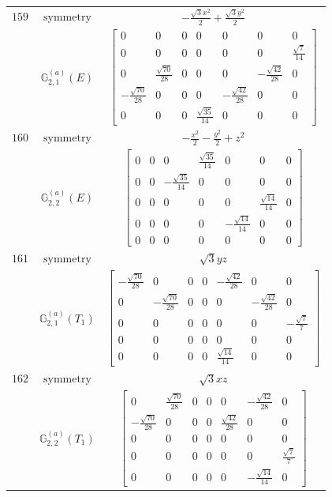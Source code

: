 \documentclass[fleqn,8pt,landscape]{jsarticle}
\begin{document}
\begin{longtable}{ccc}
$ 159 $ & $ \text{symmetry} $ & $ - \frac{\sqrt{3} x^{2}}{2} + \frac{\sqrt{3} y^{2}}{2} $ \\
$  $ & $ \mathbb{G}_{2,1}^{(a)}(E) $ & $ \begin{bmatrix} 0 & 0 & 0 & 0 & 0 & 0 & 0 \\ 0 & 0 & 0 & 0 & 0 & 0 & \frac{\sqrt{7}}{14} \\ 0 & \frac{\sqrt{70}}{28} & 0 & 0 & 0 & - \frac{\sqrt{42}}{28} & 0 \\ - \frac{\sqrt{70}}{28} & 0 & 0 & 0 & - \frac{\sqrt{42}}{28} & 0 & 0 \\ 0 & 0 & 0 & \frac{\sqrt{35}}{14} & 0 & 0 & 0 \end{bmatrix} $ \\ \hline
$ 160 $ & $ \text{symmetry} $ & $ - \frac{x^{2}}{2} - \frac{y^{2}}{2} + z^{2} $ \\
$  $ & $ \mathbb{G}_{2,2}^{(a)}(E) $ & $ \begin{bmatrix} 0 & 0 & 0 & \frac{\sqrt{35}}{14} & 0 & 0 & 0 \\ 0 & 0 & - \frac{\sqrt{35}}{14} & 0 & 0 & 0 & 0 \\ 0 & 0 & 0 & 0 & 0 & \frac{\sqrt{14}}{14} & 0 \\ 0 & 0 & 0 & 0 & - \frac{\sqrt{14}}{14} & 0 & 0 \\ 0 & 0 & 0 & 0 & 0 & 0 & 0 \end{bmatrix} $ \\ \hline
$ 161 $ & $ \text{symmetry} $ & $ \sqrt{3} y z $ \\
$  $ & $ \mathbb{G}_{2,1}^{(a)}(T_{1}) $ & $ \begin{bmatrix} - \frac{\sqrt{70}}{28} & 0 & 0 & 0 & - \frac{\sqrt{42}}{28} & 0 & 0 \\ 0 & - \frac{\sqrt{70}}{28} & 0 & 0 & 0 & - \frac{\sqrt{42}}{28} & 0 \\ 0 & 0 & 0 & 0 & 0 & 0 & - \frac{\sqrt{7}}{7} \\ 0 & 0 & 0 & 0 & 0 & 0 & 0 \\ 0 & 0 & 0 & 0 & \frac{\sqrt{14}}{14} & 0 & 0 \end{bmatrix} $ \\ \hline
$ 162 $ & $ \text{symmetry} $ & $ \sqrt{3} x z $ \\
$  $ & $ \mathbb{G}_{2,2}^{(a)}(T_{1}) $ & $ \begin{bmatrix} 0 & \frac{\sqrt{70}}{28} & 0 & 0 & 0 & - \frac{\sqrt{42}}{28} & 0 \\ - \frac{\sqrt{70}}{28} & 0 & 0 & 0 & \frac{\sqrt{42}}{28} & 0 & 0 \\ 0 & 0 & 0 & 0 & 0 & 0 & 0 \\ 0 & 0 & 0 & 0 & 0 & 0 & \frac{\sqrt{7}}{7} \\ 0 & 0 & 0 & 0 & 0 & - \frac{\sqrt{14}}{14} & 0 \end{bmatrix} $ \\ \hline

\end{longtable}
\end{document}
